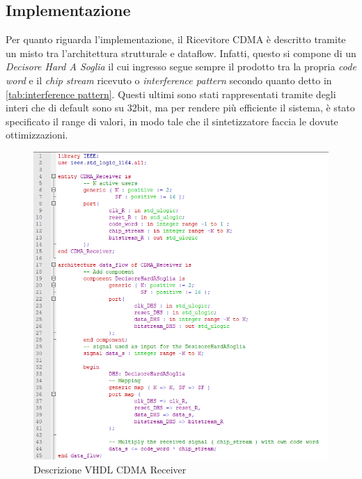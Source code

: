 \documentclass[a4paper,12pt]{article}
\begin{document}
  \subsection{Implementazione}
    Per quanto riguarda l'implementazione, il Ricevitore CDMA è descritto tramite un misto tra l'architettura strutturale
    e dataflow. Infatti, questo si compone di un \textit{Decisore Hard A Soglia} il cui ingresso segue sempre il 
    prodotto tra la propria \textit{code word} e il \textit{chip stream} ricevuto o \textit{interference pattern} secondo
    quanto detto in \ref{tab:interference pattern}.
    Questi ultimi sono stati rappresentati tramite degli interi che di 
    default sono su 32bit, ma per rendere più efficiente il sistema, è stato specificato il range di valori, in modo tale
    che il sintetizzatore faccia le dovute ottimizzazioni. 
    \begin{figure}[H]
      \centering
      \includegraphics[width=\textwidth]{img/CDMAReceiver.png}
      \caption{Descrizione VHDL CDMA Receiver}
      \label{fig:vhdl:cdma}
    \end{figure}
\end{document}
